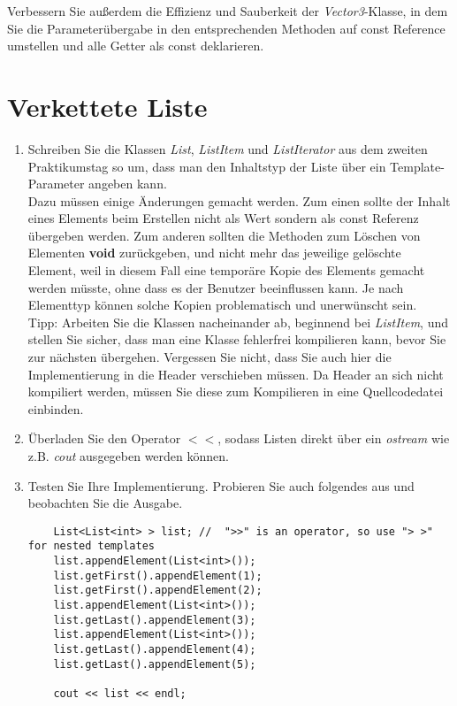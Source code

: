 \documentclass[
  accentcolor=tud1c,	%
  colorbacktitle,		%
  inverttitle,			%
  german,				%
  twoside
]{tudexercise}
\begin{document}
Verbessern Sie außerdem die Effizienz und Sauberkeit der \emph{Vector3}-Klasse, in dem Sie die Parameterübergabe in den entsprechenden Methoden auf const Reference umstellen und alle Getter als const deklarieren. 

\section{Verkettete Liste}
\begin{enumerate}
\item Schreiben Sie die Klassen \emph{List}, \emph{ListItem} und \emph{ListIterator} aus dem zweiten Praktikumstag so um, dass man den Inhaltstyp der Liste über ein Template-Parameter angeben kann.\\

Dazu müssen einige Änderungen gemacht werden. Zum einen sollte der Inhalt eines Elements beim Erstellen nicht als Wert sondern als const Referenz übergeben werden. Zum anderen sollten die Methoden zum Löschen von Elementen \textbf{void} zurückgeben, und nicht mehr das jeweilige gelöschte Element, weil in diesem Fall eine temporäre Kopie des Elements gemacht werden müsste, ohne dass es der Benutzer beeinflussen kann. Je nach Elementtyp können solche Kopien problematisch und unerwünscht sein.\\

Tipp: Arbeiten Sie die Klassen nacheinander ab, beginnend bei \emph{ListItem}, und stellen Sie sicher, dass man eine Klasse fehlerfrei kompilieren kann, bevor Sie zur nächsten übergehen. Vergessen Sie nicht, dass Sie auch hier die Implementierung in die Header verschieben müssen. Da Header an sich nicht kompiliert werden, müssen Sie diese zum Kompilieren in eine Quellcodedatei einbinden.\\

\item Überladen Sie den Operator $<<$, sodass Listen direkt über ein \emph{ostream} wie z.B. \emph{cout} ausgegeben werden können. 

\item Testen Sie Ihre Implementierung. Probieren Sie auch folgendes aus und beobachten Sie die Ausgabe.

\begin{lstlisting}
	List<List<int> > list; //  ">>" is an operator, so use "> >" for nested templates
	list.appendElement(List<int>());
	list.getFirst().appendElement(1);
	list.getFirst().appendElement(2);
	list.appendElement(List<int>());
	list.getLast().appendElement(3);
	list.appendElement(List<int>());
	list.getLast().appendElement(4);
	list.getLast().appendElement(5);
	
	cout << list << endl;
\end{lstlisting}
\end{enumerate}
\end{document}
